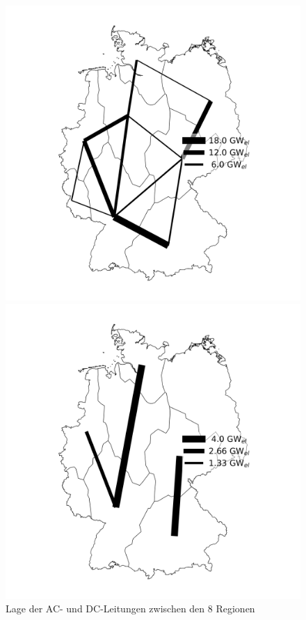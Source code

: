 \begin{figure}[!h]
    \begin{minipage}[b]{.4\linewidth} 
       \includegraphics[width=\linewidth]{images/AC-insgesamt.png}
    \end{minipage}
    \hspace{.1\linewidth}
    \begin{minipage}[b]{.4\linewidth} 
       \includegraphics[width=\linewidth]{images/DC-insgesamt.png}
    \end{minipage}
    \caption{Lage der AC- und DC-Leitungen zwischen den 8 Regionen}
    \label{image:Leitungen}
  \end{figure}


